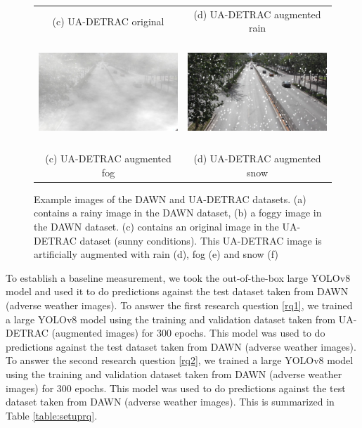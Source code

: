 \documentclass[]{article}
\begin{document}
\begin{figure}
\begin{tabular}{cc}
		(c) UA-DETRAC original  & (d) UA-DETRAC augmented rain \\[6pt]
		\includegraphics[width=65mm, height=40mm]{detrac-fog-fullres.png} &   \includegraphics[width=65mm, height=40mm]{detrac-snow-fullres.png} \\
		(c) UA-DETRAC augmented fog & (d) UA-DETRAC augmented snow \\[6pt]
	\end{tabular}
	\caption{Example images of the DAWN and UA-DETRAC datasets.  (a) contains a rainy image in the DAWN dataset, (b) a foggy image in the DAWN dataset.  (c) contains an original image in the UA-DETRAC dataset (sunny conditions).  This UA-DETRAC image is artificially augmented with rain (d), fog (e) and snow (f)  }
	\label{fig:example-images}
\end{figure}

	To establish a baseline measurement, we took the out-of-the-box large YOLO{\small v8} model and used it to do predictions against the test dataset taken from DAWN (adverse weather images).  To answer the first research question \ref{rq1}, we trained a large YOLO{\small v8} model using the training and validation dataset taken from UA-DETRAC (augmented images) for 300 epochs.  This model was used to do predictions against the test dataset taken from DAWN (adverse weather images).  To answer the second research question \ref{rq2}, we trained a large YOLO{\small v8} model using the training and validation dataset taken from DAWN (adverse weather images) for 300 epochs.  This model was used to do predictions against the test dataset taken from DAWN (adverse weather images).  This is summarized in Table \ref{table:setuprq}.
\end{document}
